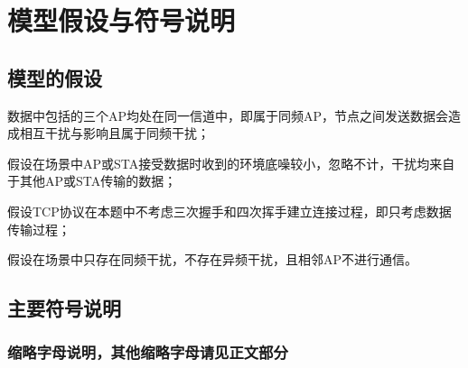 \section{模型假设与符号说明}
\subsection{模型的假设}
\begin{assumption}
	\label{asm:1}
	数据中包括的三个AP均处在同一信道中，即属于同频AP，节点之间发送数据会造成相互干扰与影响且属于同频干扰；
\end{assumption}

\begin{assumption}
	\label{asm:2}
	假设在场景中AP或STA接受数据时收到的环境底噪较小，忽略不计，干扰均来自于其他AP或STA传输的数据；
\end{assumption}

\begin{assumption}
	\label{asm:3}
	假设TCP协议在本题中不考虑三次握手和四次挥手建立连接过程，即只考虑数据传输过程；
\end{assumption}

\begin{assumption}
	\label{asm:4}
	假设在场景中只存在同频干扰，不存在异频干扰，且相邻AP不进行通信。
\end{assumption}

\subsection{主要符号说明}
\subsubsection{缩略字母说明，其他缩略字母请见正文部分}

